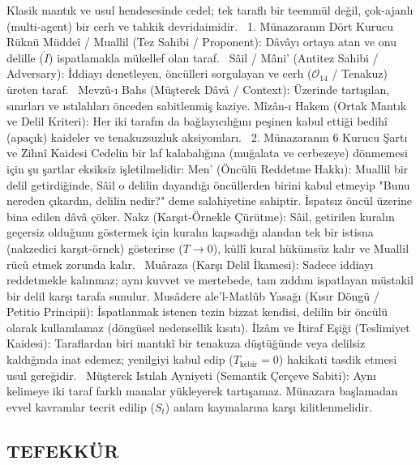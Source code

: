 \documentclass[11pt,a4paper]{article}
\begin{document}
Klasik mantık ve usul hendesesinde cedel; tek taraflı bir teemmül değil, çok-ajanlı (multi-agent) bir cerh ve tahkik devridaimidir.  
1. Münazaranın Dört Kurucu Rüknü
 Müddeî / Muallil (Tez Sahibi / Proponent): Dâvâyı ortaya atan ve onu delille (⁠$\dot{I}$⁠) ispatlamakla mükellef olan taraf.  
 Sâil / Mâni' (Antitez Sahibi / Adversary): İddiayı denetleyen, öncülleri sorgulayan ve cerh (⁠$\mathcal{O}_{14}$⁠ / Tenakuz) üreten taraf.  
 Mevzû-ı Bahs (Müşterek Dâvâ / Context): Üzerinde tartışılan, sınırları ve ıstılahları önceden sabitlenmiş kaziye.
 Mîzân-ı Hakem (Ortak Mantık ve Delil Kriteri): Her iki tarafın da bağlayıcılığını peşinen kabul ettiği bedihî (apaçık) kaideler ve tenakuzsuzluk aksiyomları.  
2. Münazaranın 6 Kurucu Şartı ve Zihnî Kaidesi
Cedelin bir laf kalabalığına (muğalata ve cerbezeye) dönmemesi için şu şartlar eksiksiz işletilmelidir:
 Men' (Öncülü Reddetme Hakkı):
Muallil bir delil getirdiğinde, Sâil o delilin dayandığı öncüllerden birini kabul etmeyip "Bunu nereden çıkardın, delilin nedir?" deme salahiyetine sahiptir. İspatsız öncül üzerine bina edilen dâvâ çöker.
 Nakz (Karşıt-Örnekle Çürütme):
Sâil, getirilen kuralın geçersiz olduğunu göstermek için kuralın kapsadığı alandan tek bir istisna (nakzedici karşıt-örnek) gösterirse (⁠$T \to 0$⁠), küllî kural hükümsüz kalır ve Muallil rücû etmek zorunda kalır.  
 Muâraza (Karşı Delil İkamesi):
Sadece iddiayı reddetmekle kalınmaz; aynı kuvvet ve mertebede, tam zıddını ispatlayan müstakil bir delil karşı tarafa sunulur.
 Musâdere ale'l-Matlûb Yasağı (Kısır Döngü / Petitio Principii):
İspatlanmak istenen tezin bizzat kendisi, delilin bir öncülü olarak kullanılamaz (döngüsel nedensellik kısıtı).
 İlzâm ve İtiraf Eşiği (Teslimiyet Kaidesi):
Taraflardan biri mantıkî bir tenakuza düştüğünde veya delilsiz kaldığında inat edemez; yenilgiyi kabul edip (⁠$T_{\text{kebîr}} = 0$⁠) hakikati tasdik etmesi usul gereğidir.  
 Müşterek Istılah Ayniyeti (Semantik Çerçeve Sabiti):
Aynı kelimeye iki taraf farklı manalar yükleyerek tartışamaz. Münazara başlamadan evvel kavramlar tecrit edilip (⁠$S_t$⁠) anlam kaymalarına karşı kilitlenmelidir. 





\subsection{TEFEKKÜR}
\end{document}
